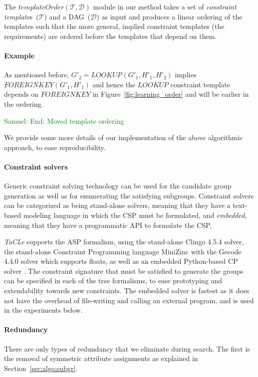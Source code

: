 \documentclass{IEEEtran}
\newcommand{\samuel}[1]{\textcolor{green}{{\sc Samuel:} #1}\xspace}
\newcommand{\constraints}{\ensuremath{\mathcal{T}}\xspace}
\newcommand{\format}[1]{\textit{#1}\xspace}
\newcommand{\constrainttorder}{\format{templateOrder}}
\newcommand{\template}{\format{constraint template}}
\newcommand{\sname}{\format{TaCLe}}
\newcommand{\dependencies}{\ensuremath{\mathcal{D}}\xspace}
\newcommand{\eccalc}[2]{\ensuremath{#1 = #2}}
\newcommand{\ecrank}[2]{\eccalc{#1}{\textit{RANK}(#2)}}
\newcommand{\ecfkey}[2]{\ensuremath{\textit{FOREIGNKEY}(#1,#2)}}
\newcommand{\eclookupf}[4]{\ensuremath{\textit{LOOKUP}_{\textit{#4}}(#1, #2, #3)}}
\newcommand{\eclookup}[4]{\eccalc{#1}{\eclookupf{#2}{#3}{#4}{}}}
\theoremstyle{definition}
\begin{document}
The $\constrainttorder(\constraints,\dependencies)$ module in our method takes a set of {\template}s~(\constraints) and a DAG~(\dependencies) as input and produces a linear ordering of the templates such that the more general, implied constraint templates (the requirements) are ordered before the templates that depend on them.

\paragraph{Example}
As mentioned before, $\eclookup{G'_2}{G'_1}{H'_1}{H'_2}$ implies $\ecfkey{G'_1}{H'_1}$ and hence the $\textit{LOOKUP}$ constraint template depends on $\textit{FOREIGNKEY}$ in Figure~\ref{fig:learning_order} and will be earlier in the ordering.

\samuel{End: Moved template ordering}


We provide some more details of our implementation of the above algorithmic approach, to ease reproducibility.

\paragraph{Constraint solvers}
Generic constraint solving technology can be used for the candidate group generation as well as for enumerating the satisfying subgroups. Constraint solvers can be categorized as being stand-alone solvers, meaning that they have a text-based modeling language in which the CSP must be formulated, and \textit{embedded}, meaning that they have a programmatic API to formulate the CSP.

\sname supports the ASP \cite{whaisasp} formalism, using the stand-alone Clingo 4.5.4 \cite{clingo} solver, the stand-alone Constraint Programming language MiniZinc \cite{minizinc} with the Gecode 4.4.0 solver which supports floats, as well as an embedded Python-based CP solver \cite{python_constraint}. The constraint signature that must be satisfied to generate the groups can be specified in each of the tree formalisms, to ease prototyping and extendability towards new constraints. The embedded solver is fastest as it does not have the overhead of file-writing and calling an external program, and is used in the experiments below.

\paragraph{Redundancy}
There are only types of redundancy that we eliminate during search. The first is the removal of symmetric attribute assignments as explained in Section~\ref{sec:algo:subgr}.
\end{document}

